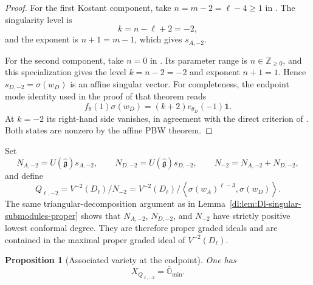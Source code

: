 \documentclass[11pt,reqno]{amsart}
\newtheorem{proposition}[theorem]{Proposition}
\theoremstyle{definition}
\theoremstyle{remark}
\begin{document}
\begin{proof}
For the first Kostant component, take \(n=m-2=\ell-4\ge1\) in
\cite[Theorem~4.2(4)(a)]{ArakawaMoreau2018}.  The singularity level is
\[
  k=n-\ell+2=-2,
\]
and the exponent is \(n+1=m-1\), which gives \(s_{A,-2}\).

For the second component, take $n=0$ in
\cite[Theorem~4.2(4)(b)]{ArakawaMoreau2018}.  Its parameter range is
$n\in\mathbb Z_{\ge0}$, and this specialization gives the level
$k=n-2=-2$ and exponent $n+1=1$.  Hence $s_{D,-2}=\sigma(w_D)$ is an
affine singular vector.  For completeness, the endpoint mode identity
used in the proof of that theorem reads
\begin{equation*}
  f_\theta(1)\sigma(w_D)
  =
  (k+2)e_{\theta_D}(-1)\mathbf1.
\end{equation*}
At $k=-2$ its right-hand side vanishes, in agreement with the direct
criterion of \cite[Lemma~4.1]{ArakawaMoreau2018}.  Both states are
nonzero by the affine PBW theorem.
\end{proof}

Set
\begin{equation*}
  N_{A,-2}=U(\widehat{\mathfrak g})s_{A,-2},
  \qquad
  N_{D,-2}=U(\widehat{\mathfrak g})s_{D,-2},
  \qquad
  N_{-2}=N_{A,-2}+N_{D,-2},
\end{equation*}
and define
\begin{equation*}
  Q_{\ell,-2}
  =
  V^{-2}(D_\ell)/N_{-2}
  =
  V^{-2}(D_\ell)
  \Big/
  \left\langle
    \sigma(w_A)^{\ell-3},
    \sigma(w_D)
  \right\rangle.
\end{equation*}
The same triangular-decomposition argument as in
Lemma~\ref{dl:lem:Dl-singular-submodules-proper} shows that
\(N_{A,-2}\), \(N_{D,-2}\), and \(N_{-2}\) have strictly positive
lowest conformal degree.  They are therefore proper graded ideals and
are contained in the maximal proper graded ideal of
\(V^{-2}(D_\ell)\).

\begin{proposition}[Associated variety at the endpoint]
\label{dl:prop:Dl-minus-two-associated-variety}
One has
\begin{equation}
  X_{Q_{\ell,-2}}
  =
  \overline{\mathbb O}_{\min}.
  \label{dl:eq:Dl-minus-two-associated-variety}
\end{equation}
\end{proposition}
\end{document}
